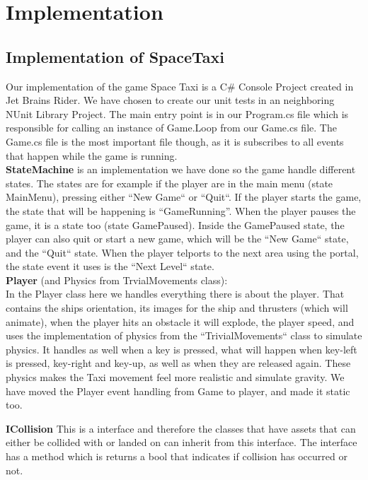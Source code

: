 \documentclass[../master.tex]{subfile}
\begin{document}
\section{Implementation}
\subsection{Implementation of SpaceTaxi}
Our implementation of the game Space Taxi is a C\# Console Project created in Jet Brains Rider. We have chosen to create our unit tests in an neighboring NUnit Library Project. The main entry point is in our Program.cs file which is responsible for calling an instance of Game.Loop from our Game.cs file. The Game.cs file is the most important file though, as it is subscribes to all events that happen while the game is running.\\

\textbf{StateMachine}
is an implementation we have done so the game handle different states. The states are for example if the player are in the main menu (state MainMenu), pressing either ``New Game`` or ``Quit``. If the player starts the game, the state that will be happening is ``GameRunning''. When the player pauses the game, it is a state too (state GamePaused). Inside the GamePaused state, the player can also quit or start a new game, which will be the ``New Game`` state, and the ``Quit`` state. When the player telports to the next area using the portal, the state event it uses is the ``Next Level`` state.\\

\textbf{Player} (and Physics from TrvialMovements class):\\
In the Player class here we handles everything there is about the player. That contains the ships orientation, its images for the ship and thrusters (which will animate), when the player hits an obstacle it will explode, the player speed, and uses the implementation of physics from the ``TrivialMovements`` class to simulate physics. It handles as well when a key is pressed, what will happen when key-left is pressed, key-right and key-up, as well as when they are released again. These physics makes the Taxi movement feel more realistic and simulate gravity. We have moved the Player event handling from Game to player, and made it static too.

\textbf{ICollision}
This is a interface and therefore the classes that have assets that can either be collided with or landed on can inherit from this interface. The interface has a method which is returns a bool that indicates if collision has occurred or not.
\end{document}
